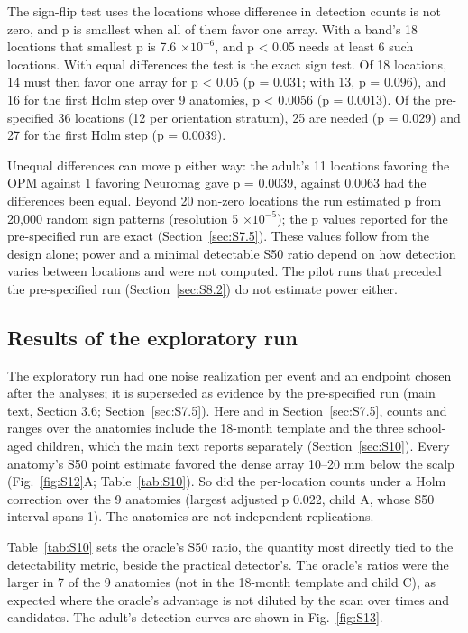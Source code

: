 \documentclass[preprint,12pt,authoryear,a4paper]{elsarticle}
\begin{document}
The sign-flip test uses the locations whose difference in detection counts is not zero, and p is smallest when all of them favor one array. With a band's 18 locations that smallest p is 7.6 $\times 10^{-6}$, and p < 0.05 needs at least 6 such locations. With equal differences the test is the exact sign test. Of 18 locations, 14 must then favor one array for p < 0.05 (p = 0.031; with 13, p = 0.096), and 16 for the first Holm step over 9 anatomies, p < 0.0056 (p = 0.0013). Of the pre-specified 36 locations (12 per orientation stratum), 25 are needed (p = 0.029) and 27 for the first Holm step (p = 0.0039).

Unequal differences can move p either way: the adult's 11 locations favoring the OPM against 1 favoring Neuromag gave p = 0.0039, against 0.0063 had the differences been equal. Beyond 20 non-zero locations the run estimated p from 20,000 random sign patterns (resolution 5 $\times 10^{-5}$); the p values reported for the pre-specified run are exact (Section~\ref{sec:S7.5}). These values follow from the design alone; power and a minimal detectable S50 ratio depend on how detection varies between locations and were not computed. The pilot runs that preceded the pre-specified run (Section~\ref{sec:S8.2}) do not estimate power either.

\subsection{Results of the exploratory run}\label{sec:S7.2}

The exploratory run had one noise realization per event and an endpoint chosen after the analyses; it is superseded as evidence by the pre-specified run (main text, Section 3.6; Section~\ref{sec:S7.5}). Here and in Section~\ref{sec:S7.5}, counts and ranges over the anatomies include the 18-month template and the three school-aged children, which the main text reports separately (Section~\ref{sec:S10}). Every anatomy's S50 point estimate favored the dense array 10–20 mm below the scalp (Fig.~\ref{fig:S12}A; Table~\ref{tab:S10}). So did the per-location counts under a Holm correction over the 9 anatomies (largest adjusted p 0.022, child A, whose S50 interval spans 1). The anatomies are not independent replications.

Table~\ref{tab:S10} sets the oracle's S50 ratio, the quantity most directly tied to the detectability metric, beside the practical detector's. The oracle's ratios were the larger in 7 of the 9 anatomies (not in the 18-month template and child C), as expected where the oracle's advantage is not diluted by the scan over times and candidates. The adult's detection curves are shown in Fig.~\ref{fig:S13}.
\end{document}

